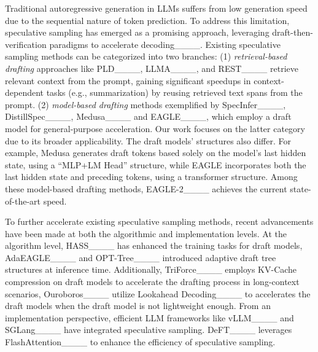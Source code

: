 Traditional autoregressive generation in LLMs suffers from low generation speed due to the sequential nature of token prediction. To address this limitation, speculative sampling has emerged as a promising approach, leveraging draft-then-verification paradigms to accelerate decoding____. Existing speculative sampling methods can be categorized into two branches:
(1) \textit{retrieval-based drafting} approaches like PLD____, LLMA____, and REST____ retrieve relevant context from the prompt, gaining significant speedups in context-dependent tasks (e.g., summarization) by reusing retrieved text spans from the prompt.
(2) \textit{model-based drafting} methods exemplified by SpecInfer____, DistillSpec____, Medusa____ and EAGLE____, which employ a draft model for general-purpose acceleration. Our work focuses on the latter category due to its broader applicability.
The draft models' structures also differ. For example, Medusa generates draft tokens based solely on the model's last hidden state, using a ``MLP+LM Head'' structure, while EAGLE incorporates both the last hidden state and preceding tokens, using a transformer structure. Among these model-based drafting methods, EAGLE-2____ achieves the current state-of-the-art speed.

To further accelerate existing speculative sampling methods, recent advancements have been made at both the algorithmic and implementation levels.
At the algorithm level, HASS____ has enhanced the training tasks for draft models, AdaEAGLE____ and OPT-Tree____ introduced adaptive draft tree structures at inference time. Additionally, TriForce____ employs KV-Cache compression on draft models to accelerate the drafting process in long-context scenarios, Ouroboros____ utilize Lookahead Decoding____ to accelerates the draft models when the draft model is not lightweight enough.
From an implementation perspective, efficient LLM frameworks like vLLM____ and SGLang____ have integrated speculative sampling. DeFT____ leverages FlashAttention____ to enhance the efficiency of speculative sampling.